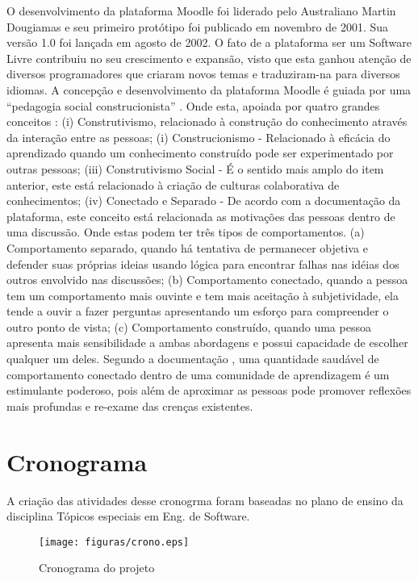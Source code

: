 O desenvolvimento da plataforma Moodle foi liderado pelo Australiano Martin  Dougiamas e seu primeiro protótipo foi publicado em novembro de 2001. Sua versão 1.0 foi lançada em agosto de 2002. O fato de a plataforma ser um Software Livre contribuiu no seu crescimento e expansão, visto que esta ganhou atenção de diversos programadores que criaram novos temas e traduziram-na para diversos idiomas.   A concepção e desenvolvimento da plataforma Moodle é guiada por uma  “pedagogia social construcionista” \cite{moodle}.
Onde esta, apoiada por quatro grandes conceitos  : (i) Construtivismo, relacionado à construção do conhecimento através da interação entre as pessoas; (i) Construcionismo - Relacionado à eficácia do aprendizado quando um conhecimento construído pode ser experimentado por outras pessoas; (iii) Construtivismo Social - É o sentido mais amplo do item anterior, este está relacionado à criação de culturas colaborativa de conhecimentos; (iv) Conectado e Separado - De acordo com a documentação da plataforma, este conceito está relacionada as motivações das pessoas dentro de uma discussão. Onde estas podem ter três tipos de comportamentos. (a) Comportamento separado, quando há tentativa de permanecer objetiva e defender suas próprias ideias usando lógica para encontrar falhas nas idéias dos outros envolvido nas discussões; (b) Comportamento conectado, quando a pessoa tem um comportamento mais ouvinte e tem mais aceitação à subjetividade, ela tende a ouvir a fazer perguntas apresentando um esforço para compreender o outro ponto de vista; (c) Comportamento construído, quando uma pessoa apresenta mais sensibilidade a ambas abordagens e possui capacidade de escolher qualquer um deles. Segundo a documentação \cite{moodle}, uma quantidade saudável de comportamento conectado dentro de uma comunidade de aprendizagem é um estimulante poderoso, pois além de aproximar as pessoas pode promover reflexões mais profundas e re-exame das crenças existentes.



\section{Cronograma}
A criação das atividades desse cronogrma foram baseadas no plano de ensino da disciplina Tópicos especiais em Eng. de Software. 

 \begin{figure}[ht]
  \centering
    \texttt{[image: figuras/crono.eps]}
  \caption{Cronograma do projeto}
\end{figure}


